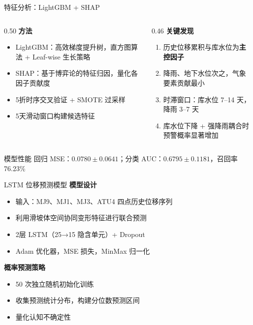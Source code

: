 \documentclass[aspectratio=169,12pt]{beamer}
\begin{document}
\begin{frame}{特征分析：LightGBM + SHAP}
  \begin{columns}[T]
    \begin{column}{0.50\textwidth}
      \textbf{方法}
      \begin{itemize}
        \item LightGBM：高效梯度提升树，直方图算法 + Leaf-wise 生长策略
        \item SHAP：基于博弈论的特征归因，量化各因子贡献度
        \item 5折时序交叉验证 + SMOTE 过采样
        \item 5天滑动窗口构建候选特征
      \end{itemize}
    \end{column}
    \begin{column}{0.46\textwidth}
      \textbf{关键发现}
      \begin{enumerate}
        \item 历史位移累积与库水位为\textbf{主控因子}
        \item 降雨、地下水位次之，气象要素贡献最小
        \item 时滞窗口：库水位 7--14 天，降雨 3--7 天
        \item 库水位下降 + 强降雨耦合时预警概率显著增加
      \end{enumerate}
    \end{column}
  \end{columns}
  \vspace{0.2em}
  \begin{alertblock}{模型性能}
    回归 MSE：$0.0780 \pm 0.0641$；分类 AUC：$0.6795 \pm 0.1181$，召回率 76.23\%
  \end{alertblock}
\end{frame}

\begin{frame}{LSTM 位移预测模型}
  \textbf{模型设计}
  \begin{itemize}
    \item 输入：MJ9、MJ1、MJ3、ATU4 四点历史位移序列
    \item 利用滑坡体空间协同变形特征进行联合预测
    \item 2层 LSTM（25→15 隐含单元）+ Dropout
    \item Adam 优化器，MSE 损失，MinMax 归一化
  \end{itemize}
  \vspace{0.5em}
  \textbf{概率预测策略}
  \begin{itemize}
    \item \alert{50 次独立随机初始化训练}
    \item 收集预测统计分布，构建分位数预测区间
    \item 量化认知不确定性
  \end{itemize}
\end{frame}
\end{document}
